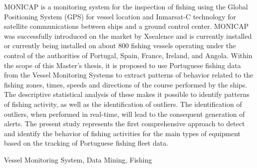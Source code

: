 \abstractEN %

MONICAP is a monitoring system for the inspection of fishing using the Global Positioning System (GPS) for vessel location and Inmarsat-C technology for satellite communications between ships and a ground control center. MONICAP was successfully introduced on the market by Xsealence and is currently installed or currently being installed on about 800 fishing vessels operating under the control of the authorities of Portugal, Spain, France, Ireland, and Angola. Within the scope of this Master's thesis, it is proposed to use Portuguese fishing data from the Vessel Monitoring Systems to extract patterns of behavior related to the fishing zones, times, speeds and directions of the course performed by the ships. The descriptive statistical analysis of these makes it possible to identify patterns of fishing activity, as well as the identification of outliers. The identification of outliers, when performed in real-time, will lead to the consequent generation of alerts. The present study represents the first comprehensive approach to detect and identify the behavior of fishing activities for the main types of equipment based on the tracking of Portuguese fishing fleet data.

\begin{keywords}
Vessel Monitoring System, Data Mining, Fishing
\end{keywords} 
